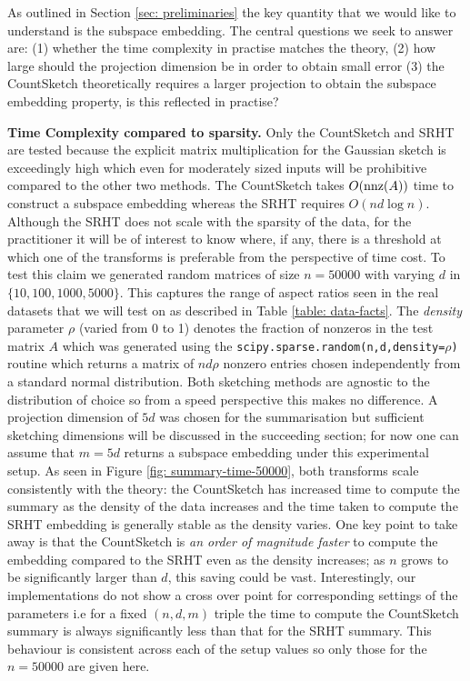 
As outlined in Section \ref{sec: preliminaries} the key quantity that we would
like to understand is the subspace embedding.
The central questions we seek to answer are: (1) whether the time complexity
in practise matches the theory, (2) how large should the projection
dimension be in order to obtain small error (3) the CountSketch
theoretically requires a larger projection to obtain the subspace embedding
property, is this reflected in practise?

\noindent\textbf{Time Complexity compared to sparsity.}
Only the CountSketch and SRHT are tested because the explicit matrix
multiplication for the Gaussian sketch is exceedingly high which even
for moderately sized inputs will be prohibitive compared to the other two methods.
The CountSketch takes
$O(\text{nnz}(A))$ time to construct a subspace embedding
whereas the SRHT requires $O(nd \log n)$.
Although the SRHT does not scale with the sparsity of the data, for the
practitioner it
will be of interest to know where, if any, there is a threshold at which one of
the transforms is preferable from the perspective of time cost.
To test this claim we generated random matrices of size $n=50000$ with varying $d$
in $\{ 10, 100, 1000,5000 \}$.
This captures the range of aspect ratios seen in the real datasets that we will
test on as described in Table \ref{table: data-facts}.
The \textit{density} parameter $\rho$ (varied from 0 to 1) denotes the
fraction of nonzeros in the test matrix $A$ which was generated using the
\texttt{scipy.sparse.random(n,d,density=$\rho$)} routine which returns a
matrix of $nd\rho$ nonzero entries chosen independently from a standard normal
distribution.
Both sketching methods are agnostic to the distribution of choice so from a
speed perspective this makes no difference.
A projection dimension of $5d$ was chosen for the summarisation but sufficient
sketching dimensions will be discussed in the succeeding section; for now one can
assume that $m=5d$ returns a subspace embedding under this experimental setup.
As seen in Figure \ref{fig: summary-time-50000}, both transforms scale
consistently with the theory: the CountSketch has increased time to compute the
summary as the density of the data increases and the time taken to compute the
SRHT embedding is generally stable as the density varies.
One key point to take away is that the CountSketch is \textit{an order
of magnitude faster} to compute the embedding compared to the SRHT even as the
density increases;
as $n$ grows to be significantly larger than $d$, this saving could be vast.
Interestingly, our implementations do not show a cross over point for corresponding
settings of the parameters i.e for a fixed $(n,d,m)$ triple the time to compute the
CountSketch summary is always significantly less than that for
the SRHT summary.
This behaviour is consistent across each of the setup values so only those for
the $n = 50000$ are given here.

